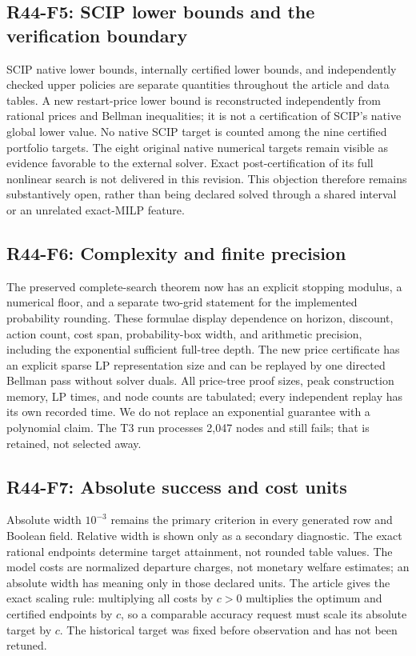 \subsection{R44-F5: SCIP lower bounds and the verification boundary}
SCIP native lower bounds, internally certified lower bounds, and independently checked upper policies are separate quantities throughout the article and data tables. A new restart-price lower bound is reconstructed independently from rational prices and Bellman inequalities; it is not a certification of SCIP's native global lower value. No native SCIP target is counted among the nine certified portfolio targets. The eight original native numerical targets remain visible as evidence favorable to the external solver. Exact post-certification of its full nonlinear search is not delivered in this revision. This objection therefore remains substantively open, rather than being declared solved through a shared interval or an unrelated exact-MILP feature.

\subsection{R44-F6: Complexity and finite precision}
The preserved complete-search theorem now has an explicit stopping modulus, a numerical floor, and a separate two-grid statement for the implemented probability rounding. These formulae display dependence on horizon, discount, action count, cost span, probability-box width, and arithmetic precision, including the exponential sufficient full-tree depth. The new price certificate has an explicit sparse LP representation size and can be replayed by one directed Bellman pass without solver duals. All price-tree proof sizes, peak construction memory, LP times, and node counts are tabulated; every independent replay has its own recorded time. We do not replace an exponential guarantee with a polynomial claim. The T3 run processes 2,047 nodes and still fails; that is retained, not selected away.

\subsection{R44-F7: Absolute success and cost units}
Absolute width $10^{-3}$ remains the primary criterion in every generated row and Boolean field. Relative width is shown only as a secondary diagnostic. The exact rational endpoints determine target attainment, not rounded table values. The model costs are normalized departure charges, not monetary welfare estimates; an absolute width has meaning only in those declared units. The article gives the exact scaling rule: multiplying all costs by $c>0$ multiplies the optimum and certified endpoints by $c$, so a comparable accuracy request must scale its absolute target by $c$. The historical target was fixed before observation and has not been retuned.

